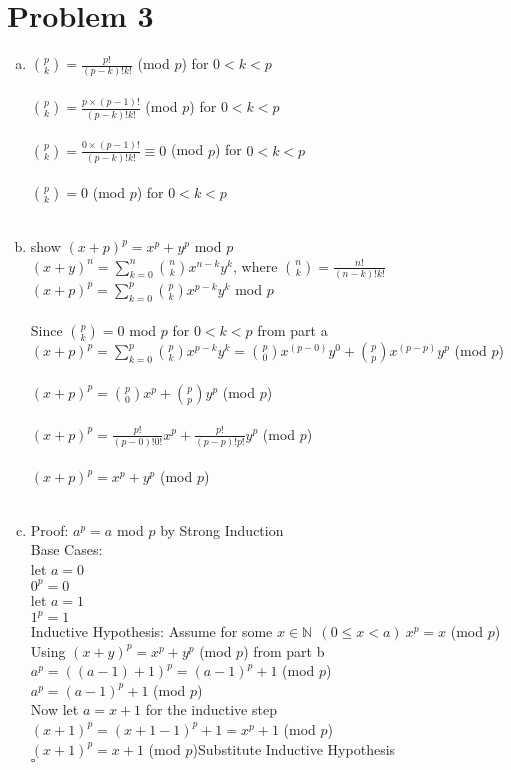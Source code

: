 \documentclass[11pt,letterpaper]{article}
\begin{document}
\section*{Problem 3}
\begin{enumerate}[(a)]
\item
${p\choose k}= \frac{p!}{(p-k)!k!}$ (mod $p$) for $0<k<p$\\\\
${p\choose k}= \frac{p\times(p-1)!}{(p-k)!k!}$ (mod $p$) for $0<k<p$\\\\
${p\choose k}= \frac{0\times(p-1)!}{(p-k)!k!} \equiv 0$ (mod $p$) for $0<k<p$\\\\
${p\choose k}= 0$ (mod $p$) for $0<k<p$\\\\
\item
show $(x+p)^p = x^p + y^p$ mod $p$\\
$(x+y)^n = \sum\limits_{k=0}^n {n\choose k}x^{n-k}y^k $, where ${n\choose k}= \frac{n!}{(n-k)!k!}$\\
$(x+p)^p = \sum\limits_{k=0}^p {p\choose k}x^{p-k}y^k$ mod $p$\\\\
Since ${p\choose k} = 0$ mod $p$ for $0<k<p$ from part a\\

$(x+p)^p = \sum\limits_{k=0}^p {p\choose k}x^{p-k}y^k = {p\choose 0} x^{(p-0)}y^0 + {p\choose p} x^{(p-p)}y^p$  (mod $p$)\\\\
$(x+p)^p = {p\choose 0} x^{p} + {p\choose p} y^p$  (mod $p$)\\\\
$(x+p)^p = \frac{p!}{(p-0)!0!} x^{p} + \frac{p!}{(p-p)!p!} y^p$  (mod $p$)\\\\
$(x+p)^p = x^{p} + y^p$  (mod $p$)\\\\
\item
Proof: $a^p = a$ mod $p$ by Strong Induction\\
Base Cases:\\
let $a=0$\\
$0^p = 0$\\
let $a=1$\\
$1^p = 1$\\
Inductive Hypothesis: Assume for some $x\in\mathbb{N} ~~(0\leq x<a)~x^p =x$ (mod $p$)\\
Using $(x+y)^p = x^p +y^p$ (mod $p$) from part b\\
$a^p = ((a-1)+ 1)^p = (a-1)^p + 1$ (mod $p$)\\
$a^p = (a-1)^p + 1$ (mod $p$)\\
Now let $a=x+1$ for the inductive step\\
$(x+1)^p = (x+1-1)^p + 1 = x^p + 1$ (mod $p$)\\
$(x+1)^p = x + 1$ (mod $p$)\hfill Substitute Inductive Hypothesis\\
\hfill$\square$
\end{enumerate}
\clearpage
\end{document}
